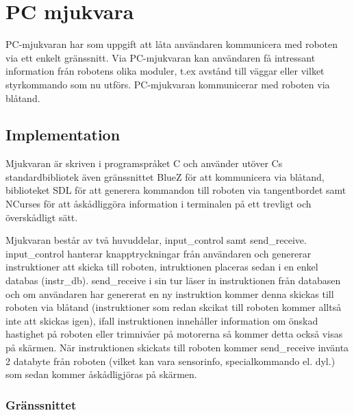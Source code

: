 \section{PC mjukvara}
PC-mjukvaran har som uppgift att låta användaren kommunicera med roboten via ett
enkelt gränssnitt. Via PC-mjukvaran kan användaren få intressant information
från robotens olika moduler, t.ex avstånd till väggar eller vilket styrkommando
som nu utförs. PC-mjukvaran kommunicerar med roboten via blåtand.

\subsection{Implementation}

Mjukvaran är skriven i programspråket C och använder utöver Cs standardbibliotek
även gränssnittet BlueZ för att kommunicera via blåtand, biblioteket SDL för att
generera kommandon till roboten via tangentbordet samt NCurses för att
åskådliggöra information i terminalen på ett trevligt och överskådligt sätt.

Mjukvaran består av två huvuddelar, input\_control samt send\_receive. input\_control
hanterar knapptryckningar från användaren och genererar instruktioner att skicka
till roboten, intruktionen placeras sedan i en enkel databas (instr\_db).
send\_receive i sin tur läser in instruktionen från databasen och om användaren
har genererat en ny instruktion kommer denna skickas till roboten via blåtand
(instruktioner som redan skcikat till roboten kommer alltså inte att skickas
 igen), ifall instruktionen innehåller information om önskad hastighet på
roboten eller trimnivåer på motorerna så kommer detta också visas på skärmen.
När instruktionen skickats till roboten kommer send\_receive invänta 2 databyte
från roboten (vilket kan vara sensorinfo, specialkommando el. dyl.) som sedan
kommer åskådligjöras på skärmen.

\subsubsection{Gränssnittet}

